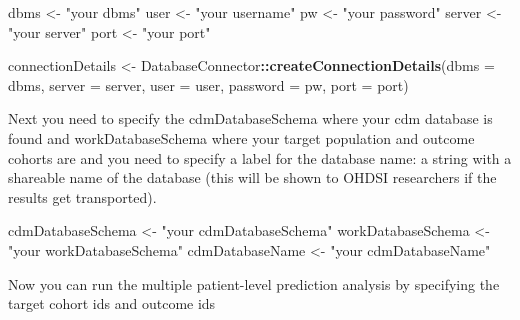 \documentclass[]{article}
\newenvironment{Shaded}{\begin{snugshade}}{\end{snugshade}}
\newcommand{\KeywordTok}[1]{\textcolor[rgb]{0.13,0.29,0.53}{\textbf{#1}}}
\newcommand{\DataTypeTok}[1]{\textcolor[rgb]{0.13,0.29,0.53}{#1}}
\newcommand{\StringTok}[1]{\textcolor[rgb]{0.31,0.60,0.02}{#1}}
\newcommand{\OperatorTok}[1]{\textcolor[rgb]{0.81,0.36,0.00}{\textbf{#1}}}
\newcommand{\NormalTok}[1]{#1}
\begin{document}
\begin{Shaded}
\begin{Highlighting}[]
\NormalTok{dbms <-}\StringTok{ "your dbms"}
\NormalTok{user <-}\StringTok{ "your username"}
\NormalTok{pw <-}\StringTok{ "your password"}
\NormalTok{server <-}\StringTok{ "your server"}
\NormalTok{port <-}\StringTok{ "your port"}

\NormalTok{connectionDetails <-}\StringTok{ }\NormalTok{DatabaseConnector}\OperatorTok{::}\KeywordTok{createConnectionDetails}\NormalTok{(}\DataTypeTok{dbms =}\NormalTok{ dbms,}
                                                                \DataTypeTok{server =}\NormalTok{ server,}
                                                                \DataTypeTok{user =}\NormalTok{ user,}
                                                                \DataTypeTok{password =}\NormalTok{ pw,}
                                                                \DataTypeTok{port =}\NormalTok{ port)}
\end{Highlighting}
\end{Shaded}

Next you need to specify the cdmDatabaseSchema where your cdm database
is found and workDatabaseSchema where your target population and outcome
cohorts are and you need to specify a label for the database name: a
string with a shareable name of the database (this will be shown to
OHDSI researchers if the results get transported).

\begin{Shaded}
\begin{Highlighting}[]
\NormalTok{cdmDatabaseSchema <-}\StringTok{ "your cdmDatabaseSchema"}
\NormalTok{workDatabaseSchema <-}\StringTok{ "your workDatabaseSchema"}
\NormalTok{cdmDatabaseName <-}\StringTok{ "your cdmDatabaseName"}
\end{Highlighting}
\end{Shaded}

Now you can run the multiple patient-level prediction analysis by
specifying the target cohort ids and outcome ids
\end{document}

